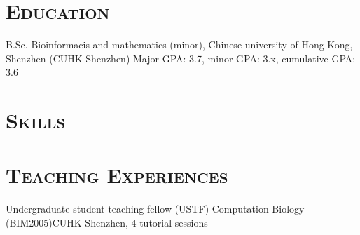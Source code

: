 \documentclass[11pt,a4paper]{moderncv}
\newcommand{\cvsection}[1]{\section{\textsc{#1}}}
\begin{document}
\maketitle

\cvsection{Education}
        {B.Sc.}
        {}
        {Bioinformacis and mathematics (minor), Chinese university of Hong Kong, Shenzhen (CUHK-Shenzhen)}
        {}
        {Major GPA: 3.7, minor GPA: 3.x, cumulative GPA: 3.6}

\cvsection{Skills}

\cvsection{Teaching Experiences}
        {Undergraduate student teaching fellow (USTF)}{}
        {Computation Biology (BIM2005)}{CUHK-Shenzhen, 4 tutorial sessions}
        {}
\end{document}
